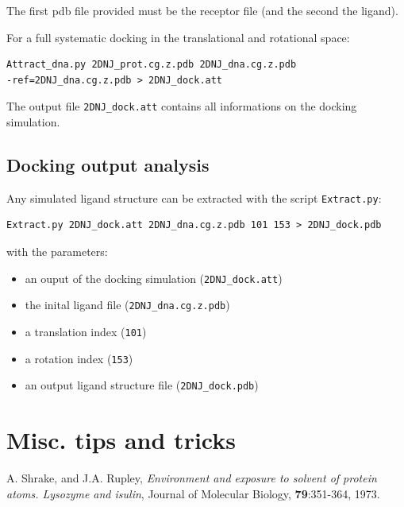 \documentclass[12pt,a4paper]{article}
\begin{document}
The first pdb file provided must be the receptor file (and the second the ligand).

For a full systematic docking in the translational and rotational space:
\begin{verbatim}
Attract_dna.py 2DNJ_prot.cg.z.pdb 2DNJ_dna.cg.z.pdb 
-ref=2DNJ_dna.cg.z.pdb > 2DNJ_dock.att
\end{verbatim}

The output file {\tt 2DNJ\_dock.att} contains all informations on the docking simulation.

\subsection{Docking output analysis}

Any simulated ligand structure can be extracted with the script {\tt Extract.py}:

\begin{verbatim}
Extract.py 2DNJ_dock.att 2DNJ_dna.cg.z.pdb 101 153 > 2DNJ_dock.pdb
\end{verbatim}

with the parameters:
\begin{itemize}
\item an ouput of the docking simulation ({\tt 2DNJ\_dock.att})
\item the inital ligand file ({\tt 2DNJ\_dna.cg.z.pdb})
\item a translation index ({\tt 101})
\item a rotation index ({\tt 153})
\item an output ligand structure file ({\tt 2DNJ\_dock.pdb})
\end{itemize}

\section{Misc. tips and tricks}

\begin{thebibliography}{99}

 A. Shrake, and J.A. Rupley, 
{\it Environment and exposure to solvent of protein atoms. Lysozyme and
isulin}, 
Journal of Molecular Biology, {\bf 79}:351-364, 1973.

\end{thebibliography}
\end{document}
